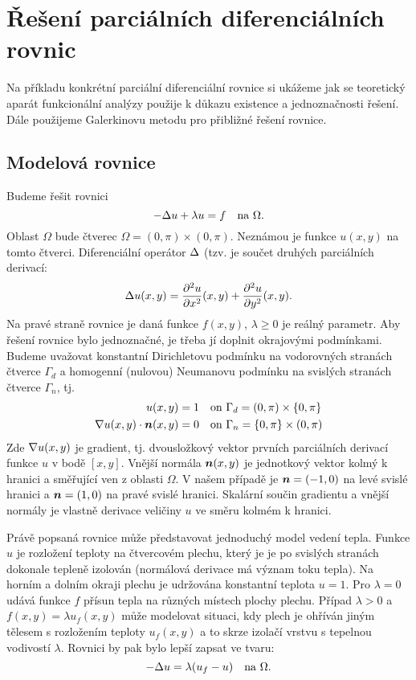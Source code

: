  \chapter{Řešení parciálních diferenciálních rovnic}
Na příkladu konkrétní parciální diferenciální rovnice si ukážeme jak se teoretický aparát funkcionální analýzy použije 
k důkazu existence a jednoznačnosti řešení. Dále použijeme Galerkinovu metodu pro přibližné řešení rovnice.


\section{Modelová rovnice}

Budeme řešit rovnici
\begin{equation}
    \label{ModelEq}
   -\Delta u + \lambda u =f \quad\text{na }\Omega.
\end{equation}
Oblast $\Omega$ bude čtverec $\Omega=(0,\pi) \times (0, \pi)$. Neznámou je funkce $u(x,y)$ na tomto čtverci.
Diferenciální operátor $\Delta$ (tzv.  je součet druhých parciálních derivací:
\[
  \Delta u(x,y) = \frac{\partial^2 u}{\partial x^2}(x,y) + \frac{\partial^2 u}{\partial y^2}(x,y).
\]
Na pravé straně rovnice je daná funkce $f(x,y)$, $\lambda \ge 0$ je reálný parametr. Aby řešení rovnice bylo jednoznačné, je třeba jí doplnit
okrajovými podmínkami. Budeme uvažovat konstantní Dirichletovu podmínku na vodorovných stranách čtverce $\Gamma_d$ a homogenní (nulovou) Neumanovu podmínku na svislých stranách čtverce $\Gamma_n$, tj.
\begin{align}
  \label{DirichletBC}
  u(x,y) &= 1     \quad\text{on } \Gamma_d = (0,\pi) \times \{0, \pi\}\\
  \label{NeumanBC}
  \nabla u(x,y) \cdot \mathbf{\boldsymbol{n}}(x,y) &= 0  \quad\text{on } \Gamma_n = \{0, \pi\} \times (0,\pi) 
\end{align}
Zde $\nabla u(x,y)$ je gradient, tj. dvousložkový vektor prvních parciálních derivací funkce $u$ v bodě $[x,y]$. Vnější normála $\mathbf{\boldsymbol{n}}(x,y)$ je jednotkový vektor kolmý k hranici a směřující ven z oblasti $\Omega$.
V našem případě je $\mathbf{\boldsymbol{n}} = (-1, 0)$ na levé svislé hranici a $\mathbf{\boldsymbol{n}} = (1, 0)$ na pravé svislé hranici. Skalární součin gradientu a vnější normály je vlastně derivace veličiny $u$ ve směru kolmém k hranici.

Právě popsaná rovnice může představovat jednoduchý model vedení tepla. Funkce $u$ je rozložení teploty na čtvercovém plechu, který je je po svislých stranách dokonale tepleně izolován (normálová derivace má význam toku tepla).
Na horním a dolním okraji plechu je udržována konstantní teplota $u=1$. Pro $\lambda =0$ udává funkce $f$ přísun tepla na různých místech plochy plechu.
Případ  $\lambda > 0$ a $f(x,y) = \lambda u_f(x,y)$ může modelovat situaci, kdy plech je ohříván jiným tělesem s rozložením teploty $u_f(x,y)$ a to skrze izolačí vrstvu s 
tepelnou vodivostí $\lambda$. Rovnici by pak bylo lepší zapsat ve tvaru:
\[
   -\Delta u = \lambda(u_f - u) \quad\text{na }\Omega.   
\]


